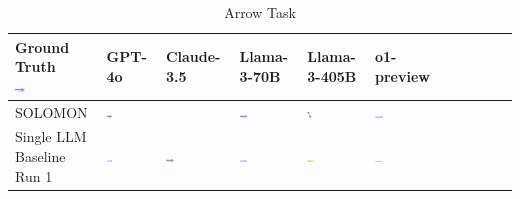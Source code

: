 \begin{table}
  \caption{Arrow Task}
  \label{table:arrow}
  \centering
  \begin{tabular}{@{}mmmmmm@{}}
    \toprule
    \makecell{Ground Truth \\ \includegraphics[width=0.13\textwidth]{examples_png/Arrow.png}} & GPT-4o & Claude-3.5 & Llama-3-70B & Llama-3-405B & o1-preview \\
    \midrule
    SOLOMON & \includegraphics[width=0.13\textwidth]{./pool_all/png/gpt-4o_results/Arrow.png} &  & \includegraphics[width=0.13\textwidth]{./pool_all/png/claude-3-5-sonnet-20240620_results/Arrow.png} & \includegraphics[width=0.13\textwidth]{./pool_all/png/watsonx_meta-llama_llama-3-1-70b-instruct_results/Arrow.png} & \includegraphics[width=0.13\textwidth]{./pool_all/png/watsonx_meta-llama_llama-3-405b-instruct_results/Arrow.png} \\
    \makecell{Single LLM \\ Baseline \\ Run 1} & \includegraphics[width=0.13\textwidth]{./run_1/png/gpt-4o_results/Arrow.png} & \includegraphics[width=0.13\textwidth]{./run_1/png/o1-preview_results/Arrow.png} & \includegraphics[width=0.13\textwidth]{./run_1/png/claude-3-5-sonnet-20240620_results/Arrow.png} & \includegraphics[width=0.13\textwidth]{./run_1/png/watsonx_meta-llama_llama-3-1-70b-instruct_results/Arrow.png} & \includegraphics[width=0.13\textwidth]{./run_1/png/watsonx_meta-llama_llama-3-405b-instruct_results/Arrow.png} \\

\end{tabular}
\end{table}

